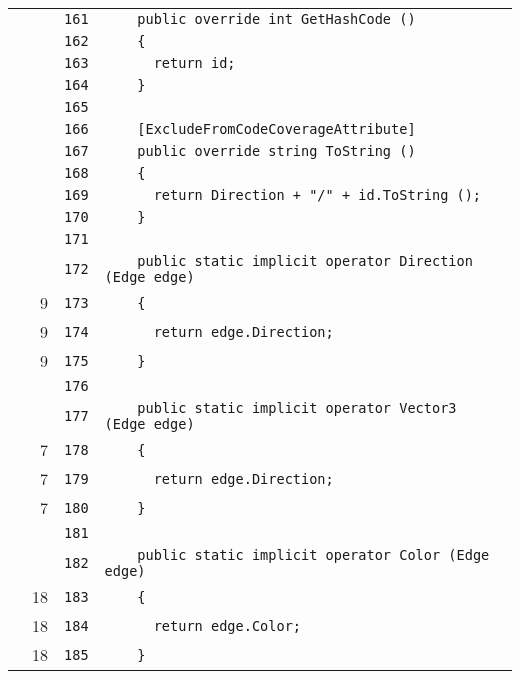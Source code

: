 \documentclass[a4paper,10pt]{article}
\begin{document}
\begin{longtable}[l]{lrrl}
\cellcolor{gray} &  & \verb~161~ & \verb~    public override int GetHashCode ()~\\
\cellcolor{gray} &  & \verb~162~ & \verb~    {~\\
\cellcolor{gray} &  & \verb~163~ & \verb~      return id;~\\
\cellcolor{gray} &  & \verb~164~ & \verb~    }~\\
\cellcolor{gray} &  & \verb~165~ & \verb~~\\
\cellcolor{gray} &  & \verb~166~ & \verb~    [ExcludeFromCodeCoverageAttribute]~\\
\cellcolor{gray} &  & \verb~167~ & \verb~    public override string ToString ()~\\
\cellcolor{gray} &  & \verb~168~ & \verb~    {~\\
\cellcolor{gray} &  & \verb~169~ & \verb~      return Direction + "/" + id.ToString ();~\\
\cellcolor{gray} &  & \verb~170~ & \verb~    }~\\
\cellcolor{gray} &  & \verb~171~ & \verb~~\\
\cellcolor{gray} &  & \verb~172~ & \verb~    public static implicit operator Direction (Edge edge)~\\
\cellcolor{green} & 9 & \verb~173~ & \verb~    {~\\
\cellcolor{green} & 9 & \verb~174~ & \verb~      return edge.Direction;~\\
\cellcolor{green} & 9 & \verb~175~ & \verb~    }~\\
\cellcolor{gray} &  & \verb~176~ & \verb~~\\
\cellcolor{gray} &  & \verb~177~ & \verb~    public static implicit operator Vector3 (Edge edge)~\\
\cellcolor{green} & 7 & \verb~178~ & \verb~    {~\\
\cellcolor{green} & 7 & \verb~179~ & \verb~      return edge.Direction;~\\
\cellcolor{green} & 7 & \verb~180~ & \verb~    }~\\
\cellcolor{gray} &  & \verb~181~ & \verb~~\\
\cellcolor{gray} &  & \verb~182~ & \verb~    public static implicit operator Color (Edge edge)~\\
\cellcolor{green} & 18 & \verb~183~ & \verb~    {~\\
\cellcolor{green} & 18 & \verb~184~ & \verb~      return edge.Color;~\\
\cellcolor{green} & 18 & \verb~185~ & \verb~    }~\\

\end{longtable}
\end{document}
